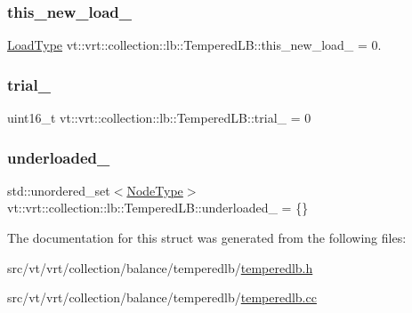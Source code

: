 \subsubsection{\texorpdfstring{this\+\_\+new\+\_\+load\+\_\+}{this\_new\_load\_}}
{\footnotesize\ttfamily \hyperlink{structvt_1_1vrt_1_1collection_1_1lb_1_1_base_l_b_a215e22b9f12678303f49615ae3be05cc}{Load\+Type} vt\+::vrt\+::collection\+::lb\+::\+Tempered\+L\+B\+::this\+\_\+new\+\_\+load\+\_\+ = 0.\hspace{0.3cm}{\ttfamily [private]}}

\mbox{\label{structvt_1_1vrt_1_1collection_1_1lb_1_1_tempered_l_b_a59a375e446dafe37a14aa784cea0af2b}} 
\subsubsection{\texorpdfstring{trial\+\_\+}{trial\_}}
{\footnotesize\ttfamily uint16\+\_\+t vt\+::vrt\+::collection\+::lb\+::\+Tempered\+L\+B\+::trial\+\_\+ = 0\hspace{0.3cm}{\ttfamily [private]}}

\mbox{\label{structvt_1_1vrt_1_1collection_1_1lb_1_1_tempered_l_b_a1fecccd06fbeae5e5632998140a3b3b7}} 
\subsubsection{\texorpdfstring{underloaded\+\_\+}{underloaded\_}}
{\footnotesize\ttfamily std\+::unordered\+\_\+set$<$\hyperlink{namespacevt_a866da9d0efc19c0a1ce79e9e492f47e2}{Node\+Type}$>$ vt\+::vrt\+::collection\+::lb\+::\+Tempered\+L\+B\+::underloaded\+\_\+ = \{\}\hspace{0.3cm}{\ttfamily [private]}}



The documentation for this struct was generated from the following files\+:\begin{DoxyCompactItemize}
\item 
src/vt/vrt/collection/balance/temperedlb/\hyperlink{temperedlb_8h}{temperedlb.\+h}\item 
src/vt/vrt/collection/balance/temperedlb/\hyperlink{temperedlb_8cc}{temperedlb.\+cc}\end{DoxyCompactItemize}
